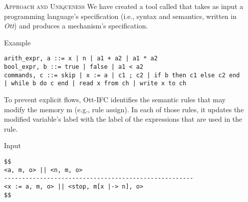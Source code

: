 \documentclass[final]{beamer}
\newlength{\onecolwid}
\newlength{\twocolwid}
\begin{document}
\begin{frame}[fragile]
\begin{columns}[t]
\begin{column}{\onecolwid}
\end{column}
\begin{column}{\twocolwid}

\begin{block}{\textsc{Approach and Uniqueness}}
We have created a tool called \emph{\ottifc} that takes as input a programming language's specification (i.e., syntax and semantics, written in \emph{Ott}) and produces a mechanism's specification. 

\begin{alertblock}{Example}
\begin{lstlisting}
arith_expr, a ::= x | n | a1 + a2 | a1 * a2 
bool_expr, b ::= true | false | a1 < a2
commands, c ::= skip | x := a | c1 ; c2 | if b then c1 else c2 end | while b do c end | read x from ch | write x to ch  
\end{lstlisting}
\end{alertblock}      
\end{block}
\vspace{-1.5cm}
\color{black}
To prevent explicit flows, Ott-IFC identifies the semantic rules that may modify the memory m (e.g., rule assign). In each of those rules, it updates the modified variable's label with the label of the expressions that are used in the rule.
\noindent
\begin{minipage}[t]{0.48\linewidth}
\begin{alertblock}{Input}
\begin{lstlisting}
$$
<a, m, o> || <n, m, o>
-----------------------------------------------------
<x := a, m, o> || <stop, m[x |-> n], o>
$$
\end{lstlisting}        
\end{alertblock}

\end{minipage}
\end{column}
\end{columns}
\end{frame}
\end{document}
